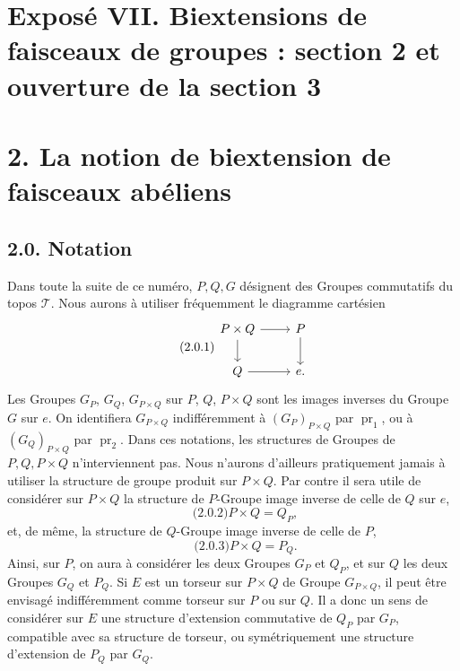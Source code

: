 \documentclass[11pt]{article}
\providecommand{\pr}{\operatorname{pr}}
\providecommand{\id}{\operatorname{id}}
\begin{document}
\providecommand{\BIEXT}{\operatorname{BIEXT}}
\providecommand{\Biext}{\operatorname{Biext}}
\providecommand{\GRAB}{\operatorname{GRAB}}
\providecommand{\TORSBIRIG}{\operatorname{TORSBIRIG}}
\providecommand{\Corr}{\operatorname{Corr}}
\providecommand{\sym}{\mathrm{sym}}
\providecommand{\id}{\mathrm{id}}
\providecommand{\cY}{\mathcal Y}
\providecommand{\cC}{\mathcal C}
\providecommand{\e}{\mathrm e}

\section*{Exposé VII. Biextensions de faisceaux de groupes : section 2 et ouverture de la section 3}

\section*{2. La notion de biextension de faisceaux abéliens}

\subsection*{2.0. Notation}
Dans toute la suite de ce numéro, \(P,Q,G\) désignent des Groupes commutatifs du topos \(\mathcal T\).  Nous aurons à utiliser fréquemment le diagramme cartésien
\begin{equation}\qquad\text{(2.0.1)}
\begin{tikzcd}
P\times Q \arrow[r] \arrow[d] & P\arrow[d]\\
Q\arrow[r] & e .
\end{tikzcd}
\end{equation}
Les Groupes \(G_P\), \(G_Q\), \(G_{P\times Q}\) sur \(P\), \(Q\), \(P\times Q\) sont les images inverses du Groupe \(G\) sur \(e\).  On identifiera \(G_{P\times Q}\) indifféremment à \((G_P)_{P\times Q}\) par \(\pr_1\), ou à \((G_Q)_{P\times Q}\) par \(\pr_2\).  Dans ces notations, les structures de Groupes de \(P,Q,P\times Q\) n'interviennent pas.  Nous n'aurons d'ailleurs pratiquement jamais à utiliser la structure de groupe produit sur \(P\times Q\).  Par contre il sera utile de considérer sur \(P\times Q\) la structure de \(P\)-Groupe image inverse de celle de \(Q\) sur \(e\),
\begin{equation}\qquad\text{(2.0.2)}
  P\times Q=Q_P,
\end{equation}
et, de même, la structure de \(Q\)-Groupe image inverse de celle de \(P\),
\begin{equation}\qquad\text{(2.0.3)}
  P\times Q=P_Q.
\end{equation}
Ainsi, sur \(P\), on aura à considérer les deux Groupes \(G_P\) et \(Q_P\), et sur \(Q\) les deux Groupes \(G_Q\) et \(P_Q\).  Si \(E\) est un torseur sur \(P\times Q\) de Groupe \(G_{P\times Q}\), il peut être envisagé indifféremment comme torseur sur \(P\) ou sur \(Q\).  Il a donc un sens de considérer sur \(E\) une structure d'extension commutative de \(Q_P\) par \(G_P\), compatible avec sa structure de torseur, ou symétriquement une structure d'extension de \(P_Q\) par \(G_Q\).
\end{document}
